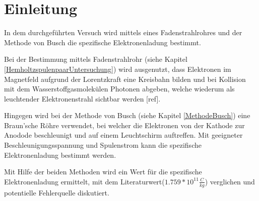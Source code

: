 \chapter{Einleitung}
\label{Einleitung}
In dem durchgeführten Versuch wird mittels eines Fadenstrahlrohres und der Methode von Busch die spezifische Elektronenladung bestimmt. 

Bei der Bestimmung mittels Fadenstrahlrohr (siehe Kapitel \ref{HemholtzspulenpaarUntersuchung}) wird ausgenutzt, dass Elektronen im Magnetfeld aufgrund der Lorentzkraft eine Kreisbahn bilden und bei Kollision mit dem Wasserstoffgasmolekülen Photonen abgeben, welche wiederum als leuchtender Elektronenstrahl sichtbar werden [ref].

Hingegen wird bei der Methode von Busch (siehe Kapitel \ref{MethodeBusch}) eine Braun'sche Röhre verwendet, bei welcher die Elektronen von der Kathode zur Anodode beschleunigt und auf einem Leuchtschirm auftreffen. Mit geeigneter Beschleunigungsspannung und Spulenstrom kann die spezifische Elektronenladung bestimmt werden.

Mit Hilfe der beiden Methoden wird ein Wert für die spezifische Elektronenladung ermittelt, mit dem Literaturwert($1.759*10^{11}\frac{C}{kg}$) verglichen und potentielle Fehlerquelle diskutiert.
